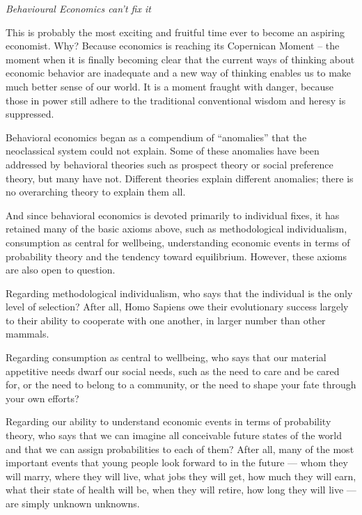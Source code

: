 \documentclass[
]{book}
\begin{document}
\emph{Behavioural Economics can't fix it}

This is probably the most exciting and fruitful time ever to become an aspiring economist. Why? Because economics is reaching its Copernican Moment -- the moment when it is finally becoming clear that the current ways of thinking about economic behavior are inadequate and a new way of thinking enables us to make much better sense of our world. It is a moment fraught with danger, because those in power still adhere to the traditional conventional wisdom and heresy is suppressed.

Behavioral economics began as a compendium of ``anomalies'' that the neoclassical system could not explain. Some of these anomalies have been addressed by behavioral theories such as prospect theory or social preference theory, but many have not. Different theories explain different anomalies; there is no overarching theory to explain them all.

And since behavioral economics is devoted primarily to individual fixes, it has retained many of the basic axioms above, such as methodological individualism, consumption as central for wellbeing, understanding economic events in terms of probability theory and the tendency toward equilibrium. However, these axioms are also open to question.

Regarding methodological individualism, who says that the individual is the only level of selection? After all, Homo Sapiens owe their evolutionary success largely to their ability to cooperate with one another, in larger number than other mammals.

Regarding consumption as central to wellbeing, who says that our material appetitive needs dwarf our social needs, such as the need to care and be cared for, or the need to belong to a community, or the need to shape your fate through your own efforts?

Regarding our ability to understand economic events in terms of probability theory, who says that we can imagine all conceivable future states of the world and that we can assign probabilities to each of them? After all, many of the most important events that young people look forward to in the future --- whom they will marry, where they will live, what jobs they will get, how much they will earn, what their state of health will be, when they will retire, how long they will live --- are simply unknown unknowns.
\end{document}
